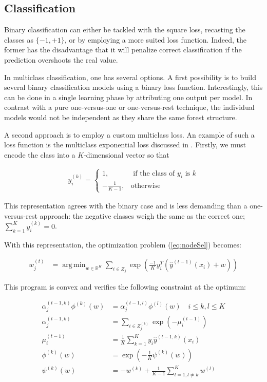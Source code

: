 \documentclass{article}
\DeclareMathOperator*{\argmin}{arg\,min}
\begin{document}
\subsection{Classification}
\label{subsec:classification}

Binary classification can either be tackled with the square loss, recasting the 
classes as $\{-1, +1\}$, or by employing a more suited loss function. Indeed, 
the former has the disadvantage that it will penalize correct classification if 
the prediction overshoots the real value.

In multiclass classification, one has several options. A first possibility is 
to build several binary classification models using a binary loss function. 
Interestingly, this can be done in a single learning phase by attributing one 
output per model. In contrast with a pure one-versus-one or one-versus-rest 
technique, the individual models would not be independent as they share the 
same forest structure.

A second approach is to employ a custom multiclass loss. An example of such a 
loss function is the multiclass exponential loss discussed in 
\citet{zhu2009multiadaboost}. Firstly, we must encode the class into a 
$K$-dimensional vector so that


\begin{align}\label{eq:MEencode}
y_i^{(k)} = \begin{cases}
1, &\text{ if the class of } y_i \text{ is } k \\
-\frac{1}{K-1}, &\text{otherwise}
\end{cases}
\end{align}

This representation agrees with the binary case and is less demanding than a 
one-versus-rest approach: the negative classes weigh the same as the correct 
one; $\sum_{k=1}^{K} y_i^{(k)} = 0$.

With this representation, the optimization problem (\ref{eq:nodeSel}) becomes:

\begin{align}\label{eq:MEmin}
w_j^{(t)} &=  \argmin_{w \in \mathbb{R}^K} \sum_{i \in Z_j} \exp 
\left(\frac{-1}{K} y_i^T \left(\hat{y}^{(t-1)}(x_i) + w \right)\right)
\end{align}

This program is convex and verifies the following constraint at the optimum:

\begin{align}\label{eq:MEequation}
\alpha_j^{(t-1, k)}\phi^{(k)}(w) &= \alpha_j^{(t-1, l)}\phi^{(l)}(w) \quad i 
\leq k,l \leq K \\
\alpha_j^{(t-1, k)} &= \sum_{i \in Z_j^{(k)}} \exp \left( - \mu_i^{(t-1)} 
\right) \\
\mu_i^{(t-1)} &= \frac{1}{K} \sum_{k=1}^{K} y_i \hat{y}^{(t-1, k)}(x_i) \\
\phi^{(k)}(w) &= \exp \left( - \frac{1}{K} \psi^{(k)}(w) \right) \\
\psi^{(k)}(w) &= -w^{(k)} + \frac{1}{K-1} \sum_{l=1, l\neq k}^{K}  w^{(l)}
\end{align}
\end{document}
